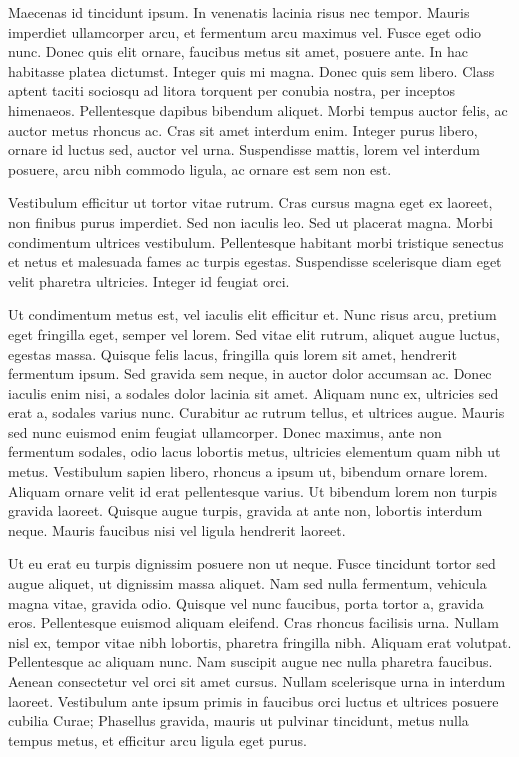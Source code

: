 Maecenas id tincidunt ipsum. In venenatis lacinia risus nec tempor. Mauris imperdiet ullamcorper arcu, et fermentum arcu maximus vel. Fusce eget odio nunc. Donec quis elit ornare, faucibus metus sit amet, posuere ante. In hac habitasse platea dictumst. Integer quis mi magna. Donec quis sem libero. Class aptent taciti sociosqu ad litora torquent per conubia nostra, per inceptos himenaeos. Pellentesque dapibus bibendum aliquet. Morbi tempus auctor felis, ac auctor metus rhoncus ac. Cras sit amet interdum enim. Integer purus libero, ornare id luctus sed, auctor vel urna. Suspendisse mattis, lorem vel interdum posuere, arcu nibh commodo ligula, ac ornare est sem non est.

Vestibulum efficitur ut tortor vitae rutrum. Cras cursus magna eget ex laoreet, non finibus purus imperdiet. Sed non iaculis leo. Sed ut placerat magna. Morbi condimentum ultrices vestibulum. Pellentesque habitant morbi tristique senectus et netus et malesuada fames ac turpis egestas. Suspendisse scelerisque diam eget velit pharetra ultricies. Integer id feugiat orci.

Ut condimentum metus est, vel iaculis elit efficitur et. Nunc risus arcu, pretium eget fringilla eget, semper vel lorem. Sed vitae elit rutrum, aliquet augue luctus, egestas massa. Quisque felis lacus, fringilla quis lorem sit amet, hendrerit fermentum ipsum. Sed gravida sem neque, in auctor dolor accumsan ac. Donec iaculis enim nisi, a sodales dolor lacinia sit amet. Aliquam nunc ex, ultricies sed erat a, sodales varius nunc. Curabitur ac rutrum tellus, et ultrices augue. Mauris sed nunc euismod enim feugiat ullamcorper. Donec maximus, ante non fermentum sodales, odio lacus lobortis metus, ultricies elementum quam nibh ut metus. Vestibulum sapien libero, rhoncus a ipsum ut, bibendum ornare lorem. Aliquam ornare velit id erat pellentesque varius. Ut bibendum lorem non turpis gravida laoreet. Quisque augue turpis, gravida at ante non, lobortis interdum neque. Mauris faucibus nisi vel ligula hendrerit laoreet.

Ut eu erat eu turpis dignissim posuere non ut neque. Fusce tincidunt tortor sed augue aliquet, ut dignissim massa aliquet. Nam sed nulla fermentum, vehicula magna vitae, gravida odio. Quisque vel nunc faucibus, porta tortor a, gravida eros. Pellentesque euismod aliquam eleifend. Cras rhoncus facilisis urna. Nullam nisl ex, tempor vitae nibh lobortis, pharetra fringilla nibh. Aliquam erat volutpat. Pellentesque ac aliquam nunc. Nam suscipit augue nec nulla pharetra faucibus. Aenean consectetur vel orci sit amet cursus. Nullam scelerisque urna in interdum laoreet. Vestibulum ante ipsum primis in faucibus orci luctus et ultrices posuere cubilia Curae; Phasellus gravida, mauris ut pulvinar tincidunt, metus nulla tempus metus, et efficitur arcu ligula eget purus.

